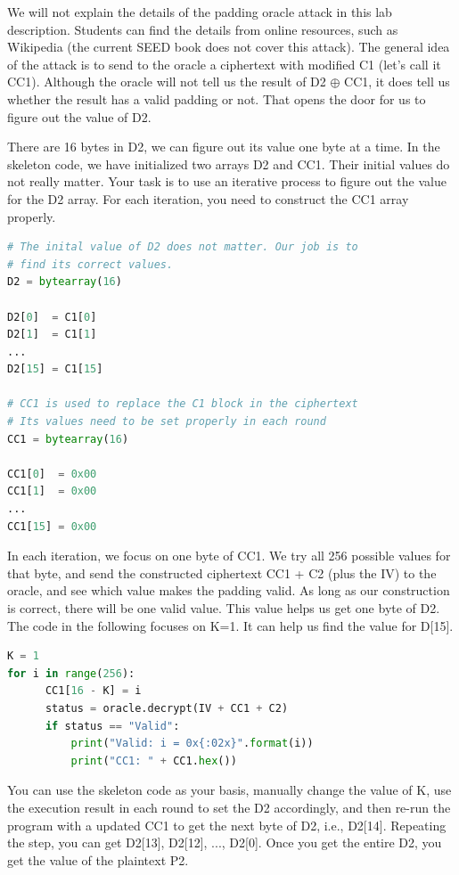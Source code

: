 We will not explain the details of the padding oracle attack
in this lab description. Students can find the details from
online resources, such as Wikipedia (the current SEED book does not 
cover this attack).  The general idea of the attack
is to send to the oracle a ciphertext with modified 
C1 (let's call it CC1). Although the oracle will not tell us the result 
of D2 $\oplus$ CC1, it does tell us whether the result
has a valid padding or not. That opens the door 
for us to figure out the value of D2. 

There are 16 bytes in D2, we can figure out its value one 
byte at a time. In the skeleton code, we have initialized
two arrays D2 and CC1. Their initial values do not really matter.
Your task is to use an iterative process to figure 
out the value for the D2 array. For each iteration, you need 
to construct the CC1 array properly. 

\begin{lstlisting}[language=python]
# The inital value of D2 does not matter. Our job is to 
# find its correct values. 
D2 = bytearray(16)

D2[0]  = C1[0]
D2[1]  = C1[1]
...
D2[15] = C1[15]

# CC1 is used to replace the C1 block in the ciphertext
# Its values need to be set properly in each round
CC1 = bytearray(16)

CC1[0]  = 0x00
CC1[1]  = 0x00
...
CC1[15] = 0x00
\end{lstlisting}

In each iteration, we focus on one byte of CC1.
We try all 256 possible values for that byte, and send the constructed
ciphertext CC1 + C2 (plus the IV) to the oracle, and see
which value makes the padding valid.
As long as our construction is correct, there will be
one valid value. This value helps us get one byte of D2.
The code in the following focuses on K=1. It can 
help us find the value for D[15].

\begin{lstlisting}[language=python]
K = 1
for i in range(256):
      CC1[16 - K] = i
      status = oracle.decrypt(IV + CC1 + C2)
      if status == "Valid":
          print("Valid: i = 0x{:02x}".format(i))
          print("CC1: " + CC1.hex())
\end{lstlisting}
 
You can use the skeleton code as your basis, manually
change the value of K, use the execution result in
each round to set the D2 accordingly, and then
re-run the program with a updated CC1
to get the next byte of D2, i.e., D2[14]. 
Repeating the step, you can get D2[13], D2[12], ..., D2[0].
Once you get the entire D2, you get the value of the plaintext P2. 

